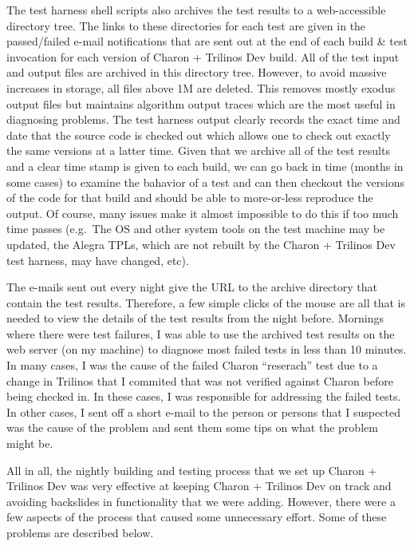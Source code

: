 \documentclass[pdf,ps2pdf,11pt]{SANDreport}
\begin{document}
The test harness shell scripts also archives the test results to a
web-accessible directory tree.  The links to these directories for each test
are given in the passed/failed e-mail notifications that are sent out at the
end of each build \& test invocation for each version of Charon + Trilinos Dev
build.  All of the test input and output files are archived in this directory
tree.  However, to avoid massive increases in storage, all files above 1M are
deleted.  This removes mostly exodus output files but maintains algorithm
output traces which are the most useful in diagnosing problems.  The test
harness output clearly records the exact time and date that the source code is
checked out which allows one to check out exactly the same versions at a
latter time.  Given that we archive all of the test results and a clear time
stamp is given to each build, we can go back in time (months in some cases) to
examine the bahavior of a test and can then checkout the versions of the code
for that build and should be able to more-or-less reproduce the output.  Of
course, many issues make it almost impossible to do this if too much time
passes (e.g.\ The OS and other system tools on the test machine may be
updated, the Alegra TPLs, which are not rebuilt by the Charon + Trilinos Dev
test harness, may have changed, etc).

The e-mails sent out every night give the URL to the archive directory that
contain the test results.  Therefore, a few simple clicks of the mouse are all
that is needed to view the details of the test results from the night before.
Mornings where there were test failures, I was able to use the archived test
results on the web server (on my machine) to diagnose most failed tests in
less than 10 minutes.  In many cases, I was the cause of the failed Charon
``reserach'' test due to a change in Trilinos that I commited that was not
verified against Charon before being checked in.  In these cases, I was
responsible for addressing the failed tests.  In other cases, I sent off a
short e-mail to the person or persons that I suspected was the cause of the
problem and sent them some tips on what the problem might be.

All in all, the nightly building and testing process that we set up Charon +
Trilinos Dev was very effective at keeping Charon + Trilinos Dev on track and
avoiding backslides in functionality that we were adding.  However, there were
a few aspects of the process that caused some unnecessary effort.  Some of
these problems are described below.
\end{document}
